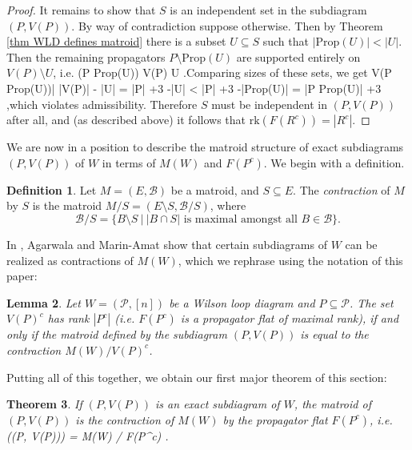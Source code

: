 \documentclass[11pt]{article}
\newcommand{\rk}{\textrm{rk} }
\def\bas #1\eas{\begin{align*} #1 \end{align*}}
\newcommand{\cP}{\mathcal{P}}
\newcommand{\cB}{\mathcal{B}}
\newcommand{\Prop}{\textrm{Prop}}
\newtheorem{thm}{Theorem}[section]
\newtheorem{lem}[thm]{Lemma}
\theoremstyle{remark}
\theoremstyle{definition}
\newtheorem{dfn}[thm]{Definition}
\begin{document}
\begin{proof}
It remains to show that $S$ is an independent set in the subdiagram $(P, V(P))$.  By way of contradiction suppose otherwise. Then by Theorem \ref{thm WLD defines matroid} there is a subset $U \subseteq S$ such that $|\Prop(U)| < |U|$. Then the remaining propagators $P \setminus \Prop(U)$ are supported entirely on $V(P) \setminus U$, i.e. \bas  V(P \setminus \Prop(U)) \subseteq V(P) \setminus U\; .\eas Comparing sizes of these sets, we get \bas |V(P \setminus \Prop(U))| \leq |V(P)| - |U| = |P| +3 -|U| < |P| +3 -|\Prop(U)| = |P \setminus \Prop(U)| +3\; ,\eas which violates admissibility. Therefore $S$ must be independent in $(P, V(P))$ after all, and (as described above) it follows that $\rk(F(R^c)) = |R^c|$.

\end{proof}

We are now in a position to describe the matroid structure of exact subdiagrams $(P, V(P))$ of $W$ in terms of $M(W)$ and $F(P^c)$. We begin with a definition.

\begin{dfn}\label{matroid contraction}
Let $M = (E,\cB)$ be a matroid, and $S \subseteq E$. The {\em contraction} of $M$ by $S$ is the matroid $M/S = (E \setminus S, \cB / S)$, where
\[\cB / S = \{B \setminus S \ \big| \ |B\cap S | \text{ is maximal amongst all }B \in \cB\}.\]
\end{dfn}

In \cite{wilsonloop}, Agarwala and Marin-Amat show that certain subdiagrams of $W$ can be realized as contractions of $M(W)$, which we rephrase using the notation of this paper:

\begin{lem} \label{contractsubdiaglem} \cite[Corollary 3.33]{wilsonloop} 
Let $W = (\cP, [n])$ be a Wilson loop diagram and $P \subseteq \cP$. The set $V(P)^c$ has rank $|P^c|$ (i.e. $F(P^c)$ is a propagator flat of maximal rank), if and only if the matroid defined by the subdiagram $(P, V(P))$ is equal to the contraction $M(W)/V(P)^c$.
\end{lem}

Putting all of this together, we obtain our first major theorem of this section:

\begin{thm} \label{exact diagrams contractions}
If $(P, V(P))$ is an exact subdiagram of $W$, the matroid of $(P,V(P))$ is the contraction of $M(W)$ by the propagator flat $F(P^c)$, i.e. \bas M\big((P, V(P))\big) = M(W)  / F(P^c) \;.\eas 
\end{thm}
\end{document}
